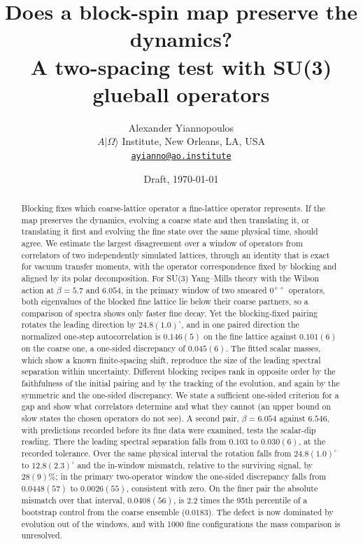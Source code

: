 \documentclass[11pt]{article}
\title{Does a block-spin map preserve the dynamics?\\[2pt]
\large A two-spacing test with SU(3) glueball operators}
\author{Alexander Yiannopoulos\\[3pt]
\small \(A|\Omega\rangle\) Institute, New Orleans, LA, USA\\
\small \href{mailto:ayianno@ao.institute}{\texttt{ayianno@ao.institute}}}
\date{Draft, \today}
\begin{document}
\maketitle

\begin{abstract}
\noindent
Blocking fixes which coarse-lattice operator a fine-lattice operator represents. If the map preserves
the dynamics, evolving a coarse state and then translating it, or translating it first and evolving the
fine state over the same physical time, should agree. We estimate the largest disagreement over a
window of operators from correlators of two independently simulated lattices, through an identity that
is exact for vacuum transfer moments, with the operator correspondence fixed by blocking and aligned by
its polar decomposition. For SU(3) Yang--Mills theory with the Wilson action at $\beta=5.7$ and $6.054$,
in the primary window of two smeared 0$^{++}$ operators, both eigenvalues of the blocked fine lattice
lie below their coarse partners, so a comparison of spectra shows only faster fine decay. Yet the
blocking-fixed pairing rotates the leading direction by $24.8(1.0)^\circ$, and in one paired direction the
normalized one-step autocorrelation is $0.146(5)$ on the fine lattice against $0.101(6)$ on the coarse
one, a one-sided discrepancy of $0.045(6)$. The fitted scalar masses, which show a known finite-spacing
shift, reproduce the size of the leading spectral separation within uncertainty. Different blocking
recipes rank in opposite order by the faithfulness of the initial pairing and by the tracking of the
evolution, and again by the symmetric and the one-sided discrepancy. We state a sufficient one-sided
criterion for a gap and show what correlators determine and what they cannot (an upper bound on slow
states the chosen operators do not see). A second pair, $\beta=6.054$ against $6.546$, with predictions
recorded before its fine data were examined, tests the scalar-dip reading. There the leading spectral
separation falls from $0.103$ to $0.030(6)$, at the recorded tolerance. Over the same physical interval
the rotation falls from $24.8(1.0)^\circ$ to $12.8(2.3)^\circ$ and the in-window mismatch, relative to the
surviving signal, by $28(9)\%$; in the primary two-operator window the one-sided discrepancy falls from
$0.0448(57)$ to $0.0026(55)$, consistent with zero. On the finer pair the absolute mismatch over that
interval, $0.0408(56)$, is 2.2 times the 95th percentile of a bootstrap control from the coarse ensemble
($0.0183$). The defect is now dominated by evolution out of
the windows, and with 1000 fine configurations the mass comparison is unresolved.
\end{abstract}
\end{document}

